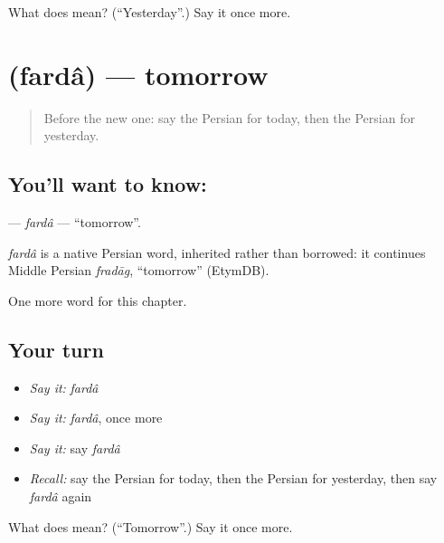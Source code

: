 \begin{tcolorbox}[breakable,colback=teal!4,colframe=teal!35!black,title={Before you move on}]
What does  mean? (\textquotedblleft{}Yesterday\textquotedblright{}.) Say it once more.
\end{tcolorbox}
\section[\texorpdfstring{\fa{فردا} (fardâ)}{فردا (fardâ)}]{ (fardâ) — tomorrow}

\label{lesson:FA-C65-farda}



\begin{quote}
Before the new one: say the Persian for today, then the Persian for yesterday.
\end{quote}

\subsection*{You'll want to know: }
\textbf{} — \emph{fardâ} — \textquotedblleft{}tomorrow\textquotedblright{}.

\begin{cousinweb}
\emph{fardâ} is a native Persian word, inherited rather than borrowed: it continues Middle Persian \emph{fradāg}, \textquotedblleft{}tomorrow\textquotedblright{} (EtymDB).
\end{cousinweb}

\begin{grammarlens}[title={What you've built}]
One more word for this chapter.
\end{grammarlens}

\subsection*{Your turn}
\begin{itemize}
\raggedright
  \item \emph{Say it:} \emph{fardâ}
  \item \emph{Say it:} \emph{fardâ}, once more
  \item \emph{Say it:} say \emph{fardâ}
  \item \emph{Recall:} say the Persian for today, then the Persian for yesterday, then say \emph{fardâ} again
\end{itemize}

\begin{tcolorbox}[breakable,colback=teal!4,colframe=teal!35!black,title={Before you move on}]
What does  mean? (\textquotedblleft{}Tomorrow\textquotedblright{}.) Say it once more.
\end{tcolorbox}

